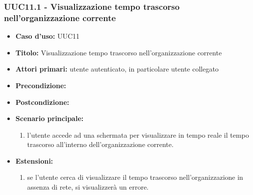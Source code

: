 \documentclass[casi-duso]{subfiles}
\begin{document}
\subsubsection{UUC11.1 - Visualizzazione tempo trascorso nell'organizzazione corrente}
\label{subsub:UUC11utente}
\begin{itemize}
  \item \textbf{Caso d’uso:} UUC11
  \item \textbf{Titolo:} Visualizzazione tempo trascorso nell'organizzazione corrente
  \item \textbf{Attori primari:} utente autenticato, in particolare utente collegato
  \item \textbf{Precondizione:} 
  \item \textbf{Postcondizione:}
  \item \textbf{Scenario principale:} 
  \begin{enumerate}
    \item l'utente accede ad una schermata per visualizzare in tempo reale il tempo trascorso all'interno dell'organizzazione corrente.
  \end{enumerate}  
  \item \textbf{Estensioni:} 
  \begin{enumerate}
    \item se l'utente cerca di visualizzare il tempo trascorso nell'organizzazione in assenza di rete, si visualizzerà un errore.
  \end{enumerate}  
\end{itemize}
\end{document}
